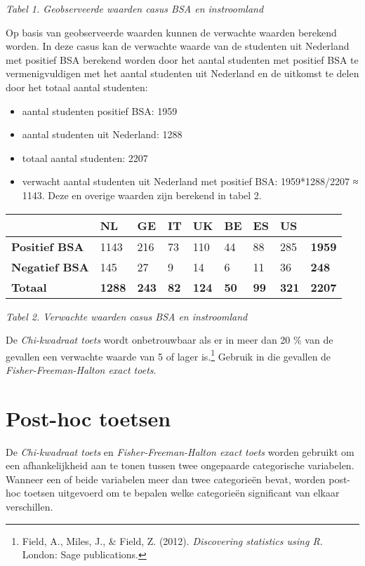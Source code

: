 \documentclass[
]{article}
\providecommand{\tightlist}{%
  \setlength{\itemsep}{0pt}\setlength{\parskip}{0pt}}
\begin{document}
\emph{Tabel 1. Geobserveerde waarden casus BSA en instroomland}

Op basis van geobserveerde waarden kunnen de verwachte waarden berekend
worden. In deze casus kan de verwachte waarde van de studenten uit
Nederland met positief BSA berekend worden door het aantal studenten met
positief BSA te vermenigvuldigen met het aantal studenten uit Nederland
en de uitkomst te delen door het totaal aantal studenten:

\begin{itemize}
\tightlist
\item
  aantal studenten positief BSA: 1959\\
\item
  aantal studenten uit Nederland: 1288\\
\item
  totaal aantal studenten: 2207
\item
  verwacht aantal studenten uit Nederland met positief BSA:
  1959*1288/2207 ≈ 1143. Deze en overige waarden zijn berekend in tabel
  2.
\end{itemize}

\begin{longtable}[]{@{}lllllllll@{}}
\toprule
& NL & GE & IT & UK & BE & ES & US &\tabularnewline
\midrule
\endhead
\textbf{Positief BSA} & 1143 & 216 & 73 & 110 & 44 & 88 & 285 &
\textbf{1959}\tabularnewline
\textbf{Negatief BSA} & 145 & 27 & 9 & 14 & 6 & 11 & 36 &
\textbf{248}\tabularnewline
\textbf{Totaal} & \textbf{1288} & \textbf{243} & \textbf{82} &
\textbf{124} & \textbf{50} & \textbf{99} & \textbf{321} &
\textbf{2207}\tabularnewline
\bottomrule
\end{longtable}

\emph{Tabel 2. Verwachte waarden casus BSA en instroomland}

De \emph{Chi-kwadraat toets} wordt onbetrouwbaar als er in meer dan 20
\% van de gevallen een verwachte waarde van 5 of lager is.\footnote{Field,
  A., Miles, J., \& Field, Z. (2012). \emph{Discovering statistics using
  R}. London: Sage publications.} Gebruik in die gevallen de
\emph{Fisher-Freeman-Halton exact toets}.

\hypertarget{post-hoc-toetsen}{%
\section{Post-hoc toetsen}\label{post-hoc-toetsen}}

De \emph{Chi-kwadraat toets} en \emph{Fisher-Freeman-Halton exact toets}
worden gebruikt om een afhankelijkheid aan te tonen tussen twee
ongepaarde categorische variabelen. Wanneer een of beide variabelen meer
dan twee categorieën bevat, worden post-hoc toetsen uitgevoerd om te
bepalen welke categorieën significant van elkaar verschillen.
\end{document}
